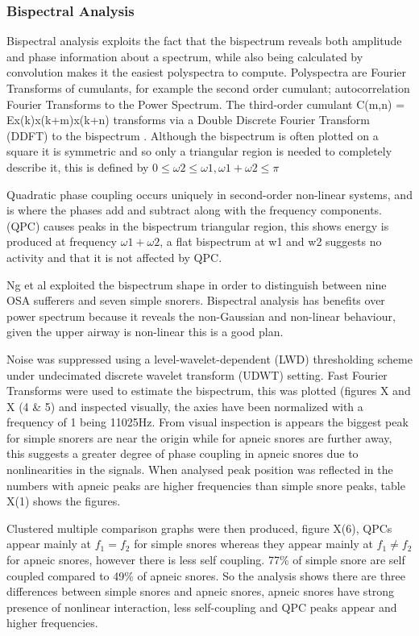 \subsubsection{Bispectral Analysis}
Bispectral analysis exploits the fact that the bispectrum reveals both amplitude and phase information about a spectrum, while also being calculated by convolution makes it the easiest polyspectra to compute. Polyspectra are Fourier Transforms of cumulants, for example the second order cumulant; autocorrelation Fourier Transforms to the Power Spectrum. The third-order cumulant C(m,n) = E{x(k)x(k+m)x(k+n)} transforms via a Double Discrete Fourier Transform (DDFT) to the bispectrum . Although the bispectrum is often plotted on a square it is symmetric and so only a triangular region is needed to completely describe it, this is defined by $0 \le \omega2 \le \omega1, \omega1 + \omega2 \le \pi$

Quadratic phase coupling occurs uniquely in second-order non-linear systems, and is where the phases add and subtract along with the frequency components. (QPC) causes peaks in the bispectrum triangular region, this shows energy is produced at frequency $\omega1 + \omega2$, a flat bispectrum at w1 and w2 suggests no activity and that it is not affected by QPC. 

Ng et al exploited the bispectrum shape in order to distinguish between nine OSA sufferers and seven simple snorers. Bispectral analysis has benefits over power spectrum because it reveals the non-Gaussian and non-linear behaviour, given the upper airway is non-linear this is a good plan. 

Noise was suppressed using a level-wavelet-dependent (LWD) thresholding scheme under undecimated discrete wavelet transform (UDWT) setting. Fast Fourier Transforms were used to estimate the bispectrum, this was plotted (figures X and X (4 \& 5) and inspected visually, the axies have been normalized with a frequency of 1 being 11025Hz. From visual inspection is appears the biggest peak for simple snorers are near the origin while for apneic snores are further away, this suggests a greater degree of phase coupling in apneic snores due to nonlinearities in the signals. When analysed peak position was reflected in the numbers with apneic peaks are higher frequencies than simple snore peaks, table X(1) shows the figures.

Clustered multiple comparison graphs were then produced, figure X(6), QPCs appear mainly at $f_1=f_2$ for simple snores whereas they appear mainly at $f_1 \not= f_2$ for apneic snores, however there is less self coupling. 77\% of simple snore are self coupled compared to 49\% of apneic snores. So the analysis shows there are three differences between simple snores and apneic snores, apneic snores have strong presence of nonlinear interaction, less self-coupling and QPC peaks appear and higher frequencies. 

